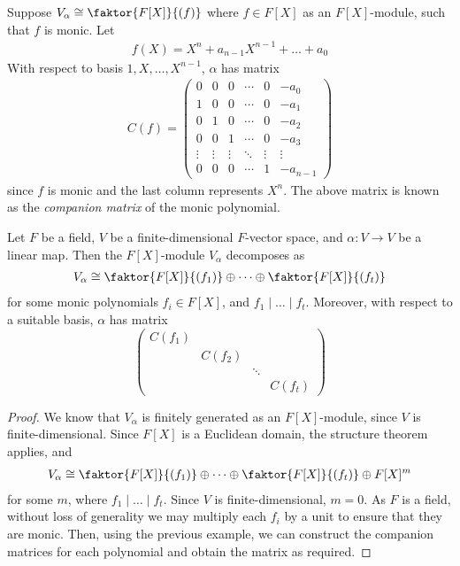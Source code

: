 \begin{example}
	Suppose $V_\alpha \cong \faktor{F[X]}{(f)}$ where $f \in F[X]$ as an $F[X]$-module, such that $f$ is monic.
	Let
	\begin{align*}
		f(X) = X^n + a_{n-1} X^{n-1} + \dots + a_0
	\end{align*}
	With respect to basis $1, X, \dots, X^{n-1}$, $\alpha$ has matrix
	\begin{align*}
		C(f) =
		\begin{pmatrix}
			0      & 0      & 0      & \cdots & 0      & -a_0     \\
			1      & 0      & 0      & \cdots & 0      & -a_1     \\
			0      & 1      & 0      & \cdots & 0      & -a_2     \\
			0      & 0      & 1      & \cdots & 0      & -a_3     \\
			\vdots & \vdots & \vdots & \ddots & \vdots & \vdots   \\
			0      & 0      & 0      & \cdots & 1      & -a_{n-1}
		\end{pmatrix}
	\end{align*}
	since $f$ is monic and the last column represents $X^n$.
	The above matrix is known as the \textit{companion matrix} of the monic polynomial.
\end{example}
\begin{theorem}
	Let $F$ be a field, $V$ be a finite-dimensional $F$-vector space, and $\alpha : V \to V$ be a linear map.
	Then the $F[X]$-module $V_\alpha$ decomposes as
	\begin{align*}
		V_\alpha \cong \faktor{F[X]}{(f_1)} \oplus \dots \oplus \faktor{F[X]}{(f_t)}
	\end{align*}
	for some monic polynomials $f_i \in F[X]$, and $f_1 \mid \dots \mid f_t$.
	Moreover, with respect to a suitable basis, $\alpha$ has matrix
	\begin{equation}
		\begin{pmatrix}
			C(f_1)                      \\
			 & C(f_2)                   \\
			 &        & \ddots          \\
			 &        &        & C(f_t)
		\end{pmatrix}
		\tag{\(\ast\ast\)}
	\end{equation}
\end{theorem}
\begin{proof}
	We know that $V_\alpha$ is finitely generated as an $F[X]$-module, since $V$ is finite-dimensional.
	Since $F[X]$ is a Euclidean domain, the structure theorem applies, and
	\begin{align*}
		V_\alpha \cong \faktor{F[X]}{(f_1)} \oplus \dots \oplus \faktor{F[X]}{(f_t)} \oplus F[X]^m
	\end{align*}
	for some $m$, where $f_1 \mid \dots \mid f_t$.
	Since $V$ is finite-dimensional, $m = 0$.
	As $F$ is a field, without loss of generality we may multiply each $f_i$ by a unit to ensure that they are monic.
	Then, using the previous example, we can construct the companion matrices for each polynomial and obtain the matrix as required.
\end{proof}
